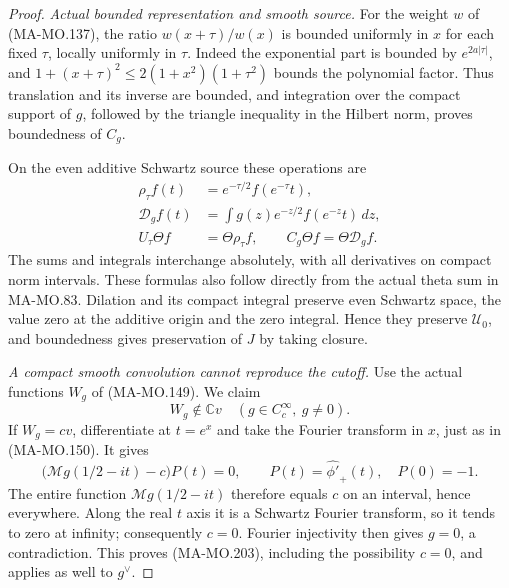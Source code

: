 \begin{proof}
\emph{Actual bounded representation and smooth source.}
For the weight \(w\) of (MA-MO.137), the ratio
\(w(x+\tau)/w(x)\) is bounded uniformly in \(x\) for
each fixed \(\tau\), locally uniformly in \(\tau\).
Indeed the exponential part is bounded by
\(e^{2a|\tau|}\), and
\(1+(x+\tau)^2\le2(1+x^2)(1+\tau^2)\)
bounds the polynomial factor. Thus translation and its
inverse are bounded, and integration over the compact
support of \(g\), followed by the triangle inequality
in the Hilbert norm, proves boundedness of \(C_g\).

On the even additive Schwartz source these operations are
\[
 \begin{aligned}
 \rho_\tau f(t)&=e^{-\tau/2}f(e^{-\tau}t),\\
 \mathcal D_g f(t)&=\int g(z)e^{-z/2}f(e^{-z}t)\,dz,\\
 U_\tau\Theta f&=\Theta\rho_\tau f,\qquad
 C_g\Theta f=\Theta\mathcal D_gf.
 \end{aligned}
 \tag{MA-MO.202}
\]
The sums and integrals interchange absolutely, with all
derivatives on compact norm intervals. These formulas also
follow directly from the actual theta sum in MA-MO.83.
Dilation and its compact integral preserve even Schwartz
space, the value zero at the additive origin and the zero
integral. Hence they preserve \(\mathscr U_0\), and
boundedness gives preservation of \(J\) by taking closure.

\emph{A compact smooth convolution cannot reproduce the cutoff.}
Use the actual functions \(W_g\) of (MA-MO.149). We claim
\[
        W_g\notin\mathbb C v
                      \quad(g\in C_c^\infty,\ g\ne0).
 \tag{MA-MO.203}
\]
If \(W_g=c v\), differentiate at \(t=e^x\) and take
the Fourier transform in \(x\), just as in (MA-MO.150).
It gives
\[
       \bigl(\mathcal Mg(1/2-it)-c\bigr)P(t)=0,
               \qquad P(t)=\widehat{\phi'}_+(t),\quad P(0)=-1.
 \tag{MA-MO.204}
\]
The entire function \(\mathcal Mg(1/2-it)\) therefore
equals \(c\) on an interval, hence everywhere. Along
the real \(t\) axis it is a Schwartz Fourier transform,
so it tends to zero at infinity; consequently \(c=0\).
Fourier injectivity then gives \(g=0\), a contradiction.
This proves (MA-MO.203), including the possibility \(c=0\),
and applies as well to \(g^\vee\).


\end{proof}
